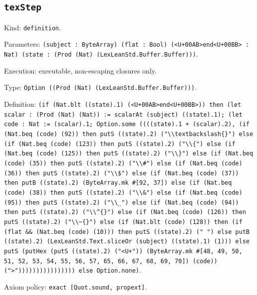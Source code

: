 \documentclass[11pt]{article}
\begin{document}
\subsection*{\texttt{texStep}}
\noindent Kind: \texttt{definition}.\par
\noindent Parameters: \texttt{(subject : ByteArray) (flat : Bool) (<U+00AB>end<U+00BB> : Nat) (state : (Prod (Nat) (LexLeanStd.Buffer.Buffer)))}.\par
\noindent Execution: executable, non-escaping closures only.\par
\noindent Type: \texttt{Option ((Prod (Nat) (LexLeanStd.Buffer.Buffer)))}.\par
\noindent Definition: \texttt{(if (Nat.blt ((state).1) (<U+00AB>end<U+00BB>)) then (let scalar : (Prod (Nat) (Nat)) := scalarAt (subject) ((state).1); (let code : Nat := (scalar).1; Option.some ((((state).1 + (scalar).2), (if (Nat.beq (code) (92)) then putS ((state).2) ("\textbackslash{}\textbackslash{}textbackslash\{\}") else (if (Nat.beq (code) (123)) then putS ((state).2) ("\textbackslash{}\textbackslash{}\{") else (if (Nat.beq (code) (125)) then putS ((state).2) ("\textbackslash{}\textbackslash{}\}") else (if (Nat.beq (code) (35)) then putS ((state).2) ("\textbackslash{}\textbackslash{}\#") else (if (Nat.beq (code) (36)) then putS ((state).2) ("\textbackslash{}\textbackslash{}\$") else (if (Nat.beq (code) (37)) then putB ((state).2) (ByteArray.mk \#[92, 37]) else (if (Nat.beq (code) (38)) then putS ((state).2) ("\textbackslash{}\textbackslash{}\&") else (if (Nat.beq (code) (95)) then putS ((state).2) ("\textbackslash{}\textbackslash{}\_") else (if (Nat.beq (code) (94)) then putS ((state).2) ("\textbackslash{}\textbackslash{}\^{}\{\}") else (if (Nat.beq (code) (126)) then putS ((state).2) ("\textbackslash{}\textbackslash{}\~{}\{\}") else (if (Nat.blt (code) (128)) then (if (flat \&\& (Nat.beq (code) (10))) then putS ((state).2) (" ") else putB ((state).2) (LexLeanStd.Text.sliceOr (subject) ((state).1) (1))) else putS (putHex (putS ((state).2) ("<U+")) (ByteArray.mk \#[48, 49, 50, 51, 52, 53, 54, 55, 56, 57, 65, 66, 67, 68, 69, 70]) (code)) (">")))))))))))))))) else Option.none)}.\par
\noindent Axiom policy: \texttt{exact [Quot.sound, propext]}.\par
\end{document}
